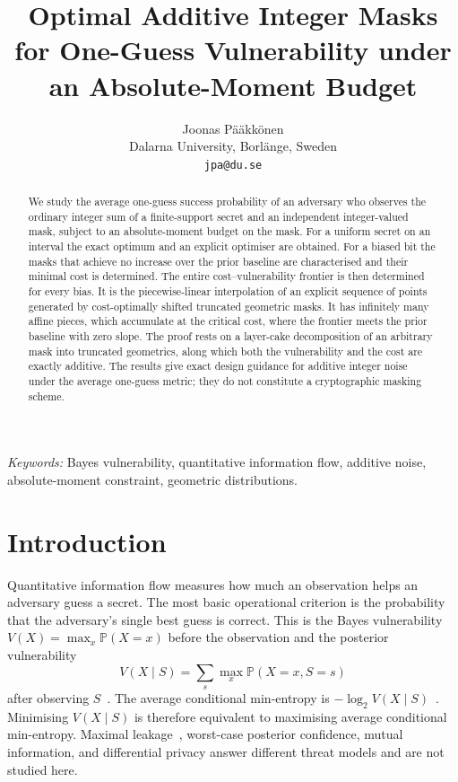 \documentclass{article}
\title{Optimal Additive Integer Masks for One-Guess Vulnerability under an Absolute-Moment Budget}
\author{Joonas P\"a\"akk\"onen\\ Dalarna University, Borl\"ange, Sweden\\ \texttt{jpa@du.se}}
\theoremstyle{definition}
\theoremstyle{remark}
\newcommand{\Prob}{\mathbb{P}}
\begin{document}
\maketitle

\begin{abstract}
We study the average one-guess success probability of an adversary who observes the ordinary integer sum of a finite-support secret and an independent integer-valued mask, subject to an absolute-moment budget on the mask. For a uniform secret on an interval the exact optimum and an explicit optimiser are obtained. For a biased bit the masks that achieve no increase over the prior baseline are characterised and their minimal cost is determined. The entire cost--vulnerability frontier is then determined for every bias. It is the piecewise-linear interpolation of an explicit sequence of points generated by cost-optimally shifted truncated geometric masks. It has infinitely many affine pieces, which accumulate at the critical cost, where the frontier meets the prior baseline with zero slope. The proof rests on a layer-cake decomposition of an arbitrary mask into truncated geometrics, along which both the vulnerability and the cost are exactly additive. The results give exact design guidance for additive integer noise under the average one-guess metric; they do not constitute a cryptographic masking scheme.
\end{abstract}

\begin{center}
\textit{Keywords:} Bayes vulnerability, quantitative information flow, additive noise, absolute-moment constraint, geometric distributions.
\end{center}

\section{Introduction}
Quantitative information flow measures how much an observation helps an adversary guess a secret. The most basic operational criterion is the probability that the adversary's single best guess is correct. This is the Bayes vulnerability \(V(X)=\max_x\Prob(X=x)\) before the observation and the posterior vulnerability
\[
V(X\mid S)=\sum_s\max_x\Prob(X=x,S=s)
\]
after observing \(S\)~\cite{Smith09}. The average conditional min-entropy is \(-\log_2 V(X\mid S)\)~\cite{DORS08}. Minimising \(V(X\mid S)\) is therefore equivalent to maximising average conditional min-entropy. Maximal leakage~\cite{IWK20}, worst-case posterior confidence, mutual information, and differential privacy answer different threat models and are not studied here.
\end{document}
